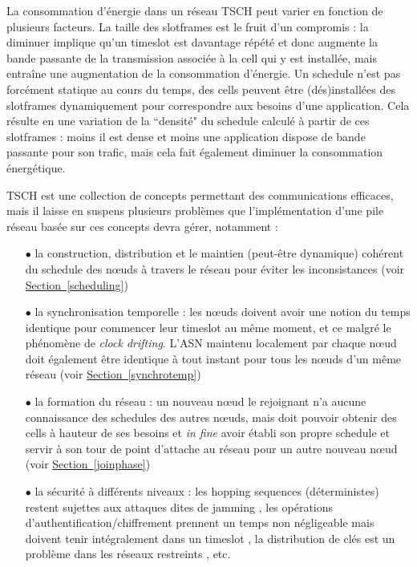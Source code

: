 \documentclass[]{report}
\newcommand{\wordlink}[2]{\hyperref[#2]{#1~\ref{#2}}}
\begin{document}
\vspace{0.7cm}

La consommation d'énergie dans un réseau TSCH peut varier en fonction de plusieurs facteurs. La taille des slotframes est le fruit d'un compromis : la diminuer implique qu'un timeslot est davantage répété et donc augmente la bande passante de la transmission associée à la cell qui y est installée, mais entraîne une augmentation de la consommation d'énergie. Un schedule n'est pas forcément statique au cours du temps, des cells peuvent être (dés)installées des slotframes dynamiquement pour correspondre aux besoins d'une application. Cela résulte en une variation de la ``densité" du schedule calculé à partir de ces slotframes : moins il est dense et moins une application dispose de bande passante pour son trafic, mais cela fait également diminuer la consommation énergétique.\\

\newpage

\par TSCH est une collection de concepts permettant des communications efficaces, mais il laisse en suspens plusieurs problèmes que l'implémentation d'une pile réseau basée sur ces concepts devra gérer, notamment :

\vspace{0.2cm}

\begin{itemize}
\item[$\bullet$] la construction, distribution et le maintien (peut-être dynamique) cohérent du schedule des nœuds à travers le réseau pour éviter les inconsistances (voir \wordlink{Section}{scheduling})
\vspace{0.2cm}
\item[$\bullet$] la synchronisation temporelle : les nœuds doivent avoir une notion du temps identique pour commencer leur timeslot au même moment, et ce malgré le phénomène de \textit{clock drifting}. L'ASN maintenu localement par chaque nœud doit également être identique à tout instant pour tous les nœuds d'un même réseau (voir \wordlink{Section}{synchrotemp})
\vspace{0.2cm}
\item[$\bullet$] la formation du réseau : un nouveau nœud le rejoignant n'a aucune connaissance des schedules des autres nœuds, mais doit pouvoir obtenir des cells à hauteur de ses besoins et \textit{in fine} avoir établi son propre schedule et servir à son tour de point d'attache au réseau pour un autre nouveau nœud (voir \wordlink{Section}{joinphase})
\vspace{0.2cm}
\item[$\bullet$] la sécurité à différents niveaux : les hopping sequences (déterministes) restent sujettes aux attaques dites de jamming \cite{R-TSCH} \cite{tiloca-6tisch-robust-scheduling-02}, les opérations d'authentification/chiffrement prennent un temps non négligeable mais doivent tenir intégralement dans un timeslot \cite{link-layer-sec-impact}, la distribution de clés est un problème dans les réseaux restreints \cite{ietf-6tisch-minimal-security-15} \cite{ietf-6tisch-dtsecurity-zerotouch-join-04}, etc.
\end{itemize}
\end{document}
